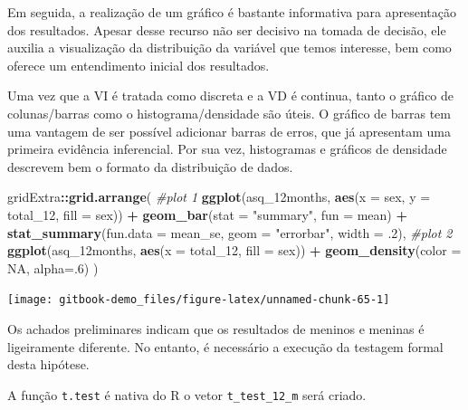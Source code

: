 \documentclass[
]{book}
\newenvironment{Shaded}{\begin{snugshade}}{\end{snugshade}}
\newcommand{\CommentTok}[1]{\textcolor[rgb]{0.56,0.35,0.01}{\textit{#1}}}
\newcommand{\DataTypeTok}[1]{\textcolor[rgb]{0.13,0.29,0.53}{#1}}
\newcommand{\DecValTok}[1]{\textcolor[rgb]{0.00,0.00,0.81}{#1}}
\newcommand{\FloatTok}[1]{\textcolor[rgb]{0.00,0.00,0.81}{#1}}
\newcommand{\KeywordTok}[1]{\textcolor[rgb]{0.13,0.29,0.53}{\textbf{#1}}}
\newcommand{\NormalTok}[1]{#1}
\newcommand{\OperatorTok}[1]{\textcolor[rgb]{0.81,0.36,0.00}{\textbf{#1}}}
\newcommand{\OtherTok}[1]{\textcolor[rgb]{0.56,0.35,0.01}{#1}}
\newcommand{\StringTok}[1]{\textcolor[rgb]{0.31,0.60,0.02}{#1}}
\begin{document}
Em seguida, a realização de um gráfico é bastante informativa para
apresentação dos resultados. Apesar desse recurso não ser decisivo na
tomada de decisão, ele auxilia a visualização da distribuição da
variável que temos interesse, bem como oferece um entendimento inicial
dos resultados.

Uma vez que a VI é tratada como discreta e a VD é continua, tanto o
gráfico de colunas/barras como o histograma/densidade são úteis. O
gráfico de barras tem uma vantagem de ser possível adicionar barras de
erros, que já apresentam uma primeira evidência inferencial. Por sua
vez, histogramas e gráficos de densidade descrevem bem o formato da
distribuição de dados.

\begin{Shaded}
\begin{Highlighting}[]
\NormalTok{gridExtra}\OperatorTok{::}\KeywordTok{grid.arrange}\NormalTok{(}
  \CommentTok{#plot 1 }
  \KeywordTok{ggplot}\NormalTok{(asq_12months, }\KeywordTok{aes}\NormalTok{(}\DataTypeTok{x =}\NormalTok{ sex, }\DataTypeTok{y =}\NormalTok{ total_}\DecValTok{12}\NormalTok{, }\DataTypeTok{fill =}\NormalTok{ sex)) }\OperatorTok{+}
\StringTok{    }\KeywordTok{geom_bar}\NormalTok{(}\DataTypeTok{stat =} \StringTok{"summary"}\NormalTok{, }\DataTypeTok{fun =}\NormalTok{ mean) }\OperatorTok{+}
\StringTok{    }\KeywordTok{stat_summary}\NormalTok{(}\DataTypeTok{fun.data =}\NormalTok{ mean_se, }\DataTypeTok{geom =} \StringTok{"errorbar"}\NormalTok{, }\DataTypeTok{width =} \FloatTok{.2}\NormalTok{),}
  \CommentTok{#plot 2}
    \KeywordTok{ggplot}\NormalTok{(asq_12months, }\KeywordTok{aes}\NormalTok{(}\DataTypeTok{x =}\NormalTok{ total_}\DecValTok{12}\NormalTok{, }\DataTypeTok{fill =}\NormalTok{ sex)) }\OperatorTok{+}\StringTok{ }
\StringTok{    }\KeywordTok{geom_density}\NormalTok{(}\DataTypeTok{color =} \OtherTok{NA}\NormalTok{, }\DataTypeTok{alpha=}\NormalTok{.}\DecValTok{6}\NormalTok{)}
\NormalTok{)}
\end{Highlighting}
\end{Shaded}

\begin{center}\texttt{[image: gitbook-demo\_files/figure-latex/unnamed-chunk-65-1]} \end{center}

Os achados preliminares indicam que os resultados de meninos e meninas é
ligeiramente diferente. No entanto, é necessário a execução da testagem
formal desta hipótese.

A função \texttt{t.test} é nativa do R o vetor \texttt{t\_test\_12\_m}
será criado.
\end{document}
